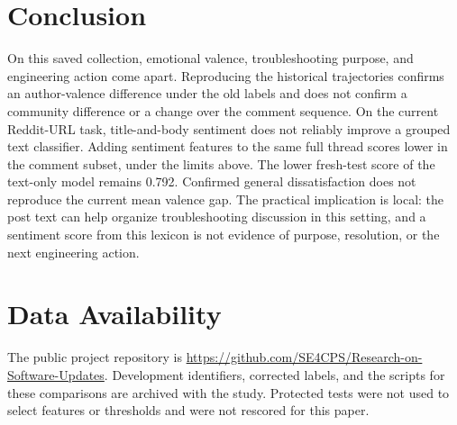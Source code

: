 \documentclass[conference,letterpaper]{IEEEtran}
\begin{document}
\section{Conclusion}
On this saved collection, emotional valence, troubleshooting purpose, and engineering action come apart. Reproducing the historical trajectories confirms an author-valence difference under the old labels and does not confirm a community difference or a change over the comment sequence. On the current Reddit-URL task, title-and-body sentiment does not reliably improve a grouped text classifier. Adding sentiment features to the same full thread scores lower in the comment subset, under the limits above. The lower fresh-test score of the text-only model remains 0.792. Confirmed general dissatisfaction does not reproduce the current mean valence gap. The practical implication is local: the post text can help organize troubleshooting discussion in this setting, and a sentiment score from this lexicon is not evidence of purpose, resolution, or the next engineering action.

\section*{Data Availability}
The public project repository is {\renewcommand\UrlBreaks{\do\/}\url{https://github.com/SE4CPS/Research-on-Software-Updates}}. Development identifiers, corrected labels, and the scripts for these comparisons are archived with the study. Protected tests were not used to select features or thresholds and were not rescored for this paper.



\end{document}
